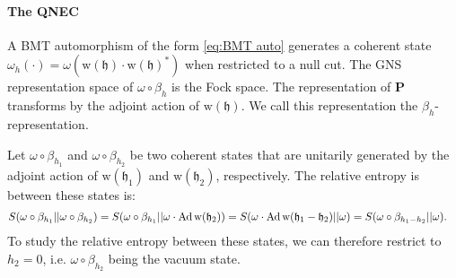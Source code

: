 \documentclass[12pt]{article}
\def\Ad{{\hbox{\rm Ad\,}}}
\def\tP{\textbf{P}}
\theoremstyle{remark}
\begin{document}
\paragraph{The QNEC}
A BMT automorphism of the form \eqref{eq:BMT auto} generates a coherent state $\omega_h(\cdot)=\omega(\mathrm w(\mathfrak h)\cdot \mathrm w(\mathfrak h)^*)$
when restricted to a null cut. The GNS representation space of $\omega\circ \beta_h$ is the Fock space. The representation of $\tP$ transforms by the adjoint action of $\mathrm w(\mathfrak h)$. We call this representation the $\beta_h$-representation.


Let $\omega\circ \beta_{h_1}$ and $\omega\circ \beta_{h_2}$ be two coherent states that are unitarily generated by the adjoint action of $\mathrm w(\mathfrak{h}_1)$ and $\mathrm w(\mathfrak{h}_2)$, respectively. The relative entropy is between these states is:
\begin{align*}
	S(\omega\circ \beta_{h_1}||\omega\circ \beta_{h_2})&=S(\omega\circ \beta_{h_1}||\omega \cdot \Ad \mathrm w(\mathfrak{h}_2))=S(\omega\cdot \Ad \mathrm w(\mathfrak{h}_1-\mathfrak{h}_2)||\omega)=S(\omega\circ \beta_{h_1-h_2}||\omega).
\end{align*}
To study the relative entropy between these states, we can therefore restrict to $h_2=0$, i.e. $\omega \circ \beta_{h_2}$ being the vacuum state.
\end{document}
